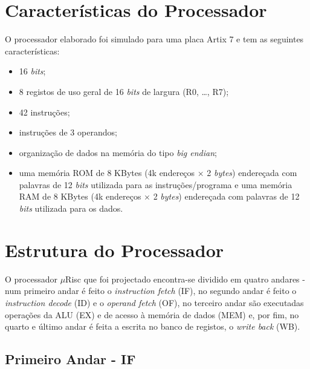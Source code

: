\documentclass[11pt]{article}
\numberwithin{equation}{section}
\begin{document}

\section{Características do Processador}

O processador elaborado foi simulado para uma placa Artix 7 e tem as seguintes características:

\vspace{-2mm}

\begin{itemize}
  \item 16 \textit{bits};
  \vspace{-2.5mm}
  \item 8 registos de uso geral de 16 \textit{bits} de largura (R0, \ldots, R7);
  \vspace{-2.5mm}
  \item 42 instruções;
  \vspace{-2.5mm}
  \item instruções de 3 operandos;
  \vspace{-2.5mm}
  \item organização de dados na memória do tipo \textit{big endian};
  \vspace{-2.5mm}
  \item uma memória ROM de 8 KBytes (4k endereços $\times$ 2 \textit{bytes}) endereçada com palavras de 12 \textit{bits} utilizada para as instruções/programa e uma memória RAM de 8 KBytes (4k endereços $\times$ 2 \textit{bytes}) endereçada com palavras de 12 \textit{bits} utilizada para os dados.
\end{itemize}

\section{Estrutura do Processador}

O processador $\mu$Risc que foi projectado encontra-se dividido em quatro andares - num primeiro andar é feito o \textit{instruction fetch} (IF), no segundo andar é feito o \textit{instruction decode} (ID) e o \textit{operand fetch} (OF), no terceiro andar são executadas operações da ALU (EX) e de acesso à memória de dados (MEM) e, por fim, no quarto e último andar é feita a escrita no banco de registos, o \textit{write back} (WB).

\subsection{Primeiro Andar - IF}
\end{document}
